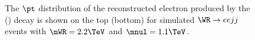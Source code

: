 \begin{figure}[btp]
	\centering
	\label{fig:wrLeptonPts}
	\caption{The $\pt$ distribution of the reconstructed electron produced by the \WR (\nul) decay is shown on the top (bottom) for 
		simulated $\WR \rightarrow eejj$ events with $\mWR = 2.2 \TeV$ and $\mnul = 1.1 \TeV$.}
\end{figure}

